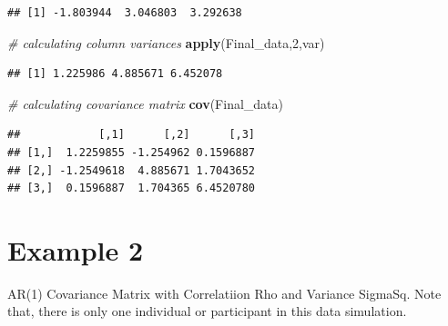 \documentclass[
]{book}
\newenvironment{Shaded}{\begin{snugshade}}{\end{snugshade}}
\newcommand{\CommentTok}[1]{\textcolor[rgb]{0.56,0.35,0.01}{\textit{#1}}}
\newcommand{\DecValTok}[1]{\textcolor[rgb]{0.00,0.00,0.81}{#1}}
\newcommand{\KeywordTok}[1]{\textcolor[rgb]{0.13,0.29,0.53}{\textbf{#1}}}
\newcommand{\NormalTok}[1]{#1}
\begin{document}
\begin{verbatim}
## [1] -1.803944  3.046803  3.292638
\end{verbatim}

\begin{Shaded}
\begin{Highlighting}[]
\CommentTok{# calculating column variances}
\KeywordTok{apply}\NormalTok{(Final_data,}\DecValTok{2}\NormalTok{,var)}
\end{Highlighting}
\end{Shaded}

\begin{verbatim}
## [1] 1.225986 4.885671 6.452078
\end{verbatim}

\begin{Shaded}
\begin{Highlighting}[]
\CommentTok{# calculating covariance matrix}
\KeywordTok{cov}\NormalTok{(Final_data)}
\end{Highlighting}
\end{Shaded}

\begin{verbatim}
##            [,1]      [,2]      [,3]
## [1,]  1.2259855 -1.254962 0.1596887
## [2,] -1.2549618  4.885671 1.7043652
## [3,]  0.1596887  1.704365 6.4520780
\end{verbatim}

\hypertarget{example-2}{%
\section{Example 2}\label{example-2}}

AR(1) Covariance Matrix with Correlatiion Rho and Variance SigmaSq. Note that, there is only one individual or participant in this data simulation.
\end{document}
